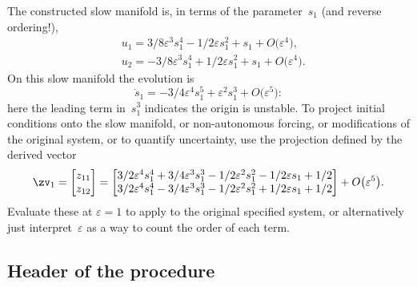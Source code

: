 \documentclass[11pt,a5paper]{article}
\def\eps{\varepsilon}
\begin{document}
The constructed slow manifold is, in terms of the
parameter~\(s_1\) (and reverse ordering!), 
\begin{align*}&
u_{1}=3/8 \eps^{3} s_{1}^{4}-1/2 \eps s_{1}^{2}+s_{1}
+O\big(\varepsilon ^{4}\big),
\\&
u_{2}=-3/8 \eps^{3} s_{1}^{4}+1/2 \eps s_{1}^{2}+s_{1}
+O\big(\varepsilon ^{4}\big).
\end{align*}
On this slow manifold the evolution is
\begin{equation*}
\dot s_{1}=-3/4 \eps^{4} s_{1}^{5}+\eps^{2} s_{1}^{3}
+O\big(\varepsilon ^{5}\big):
\end{equation*}
here the leading term in~\(s_1^3\) indicates the origin is
unstable. To project initial conditions onto the slow
manifold, or non-autonomous forcing, or modifications of the
original system, or to quantify uncertainty, use the
projection defined by the derived vector
\begin{equation*}
\zv_1=\begin{bmatrix}z_{11}\\z_{12}\end{bmatrix}
=\begin{bmatrix}
3/2 \eps^{4} s_{1}^{4}+3/4 \eps^{3} s_{1}^{3}-1/2 \eps^{2} s_{1}
^{2}-1/2 \eps s_{1}+1/2
\\
3/2 \eps^{4} s_{1}^{4}-3/4 \eps^{3} s_{1}^{3}-1/2 \eps^{2} s_{1}
^{2}+1/2 \eps s_{1}+1/2
\end{bmatrix}+O\big(\varepsilon ^{5}\big).
\end{equation*}
Evaluate these at \(\eps=1\) to apply to the original
specified system, or alternatively just interpret~\(\eps\) 
as a way to count the order of each term.




\subsection{Header of the procedure}
\end{document}
